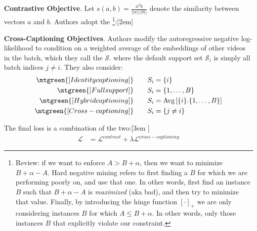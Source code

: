 \documentclass[11pt]{article}
\begin{document}
\textbf{Contrastive Objective}. Let $s(a, b) = \frac{a^T b}{||a|| ||b||}$ denote the similarity between vectors $a$ and $b$. Authors adopt the \footnote{Review: if we want to enforce $A > B + \alpha$, then we want to minimize $B + \alpha - A$. Hard negative mining refers to first finding a $B$ for which we are performing poorly on, and use that one. In other words, first find an instance $B$ such that $B + \alpha - A$ is \textit{maximized} (aka bad), and then try to minimize that value. Finally, by introducing the hinge function $[\cdot]_+$ we are only considering instances $B$ for which $A \leq B + \alpha$. In other words, only those instances $B$ that explicitly violate our constraint.}:[2em]

\textbf{Cross-Captioning Objectives}. Authors modify the autoregressive negative log-likelihood to condition on a weighted average of the embeddings of other videos in the batch, which they call the  $\mathcal S$. 
where the default support set $\mathcal S_i$ is simply all batch indices $j \neq i$. They also consider:
\begin{align}
	\mtgreen{[Identity captioning]}\qquad
		S_i &= \{ i \} \\
	\mtgreen{[Full support]}\qquad 
		S_i &= \{1, \ldots, B \} \\
	\mtgreen{[Hybrid captioning]}\qquad 
		S_i &=  \text{Avg}\left[ \{ i \}.   \{1, \ldots, B \}   \right] \\
	\mtgreen{[Cross-captioning]}\qquad 
		S_i &= \{j \neq i \}
\end{align}

The final loss is a combination of the two:[3em ]
\begin{align}
	\mathcal{L}	
		&= \mathcal{L}^{contrast} + \lambda \mathcal{L}^{cross-captioning}
\end{align}
\end{document}

